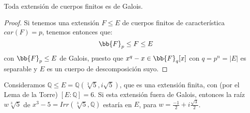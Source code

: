 \begin{coro}
    Toda extensión de cuerpos finitos es de Galois.
    \begin{proof}
        Si tenemos una extensión $F\leq E$ de cuerpos finitos de característica $car(F)=p$, tenemos entonces que:
        \begin{equation*}
            \bb{F}_p\leq F \leq E
        \end{equation*}
        con $\bb{F}_p\leq E$ de Galois, puesto que $x^q-x \in \bb{F}_q[x]$ con $q=p^n = |E|$ es separable y $E$ es un cuerpo de descomposición suyo.
    \end{proof}
\end{coro}

\begin{ejemplo}
    Consideramos $\mathbb{Q}\leq E=\mathbb{Q}\left(\sqrt[3]{5},i\sqrt{5}\right)$, que es una extensión finita, con (por el Lema de la Torre) $[E:\mathbb{Q}] = 6$. Si esta extensión fuera de Galois, entonces la raíz $w\sqrt[3]{5}$ de $x^3-5=Irr(\sqrt[3]{5},\mathbb{Q})$ estaría en $E$, para $w = \frac{-1}{2} + i\frac{\sqrt{3}}{2}$.\\


\end{ejemplo}
